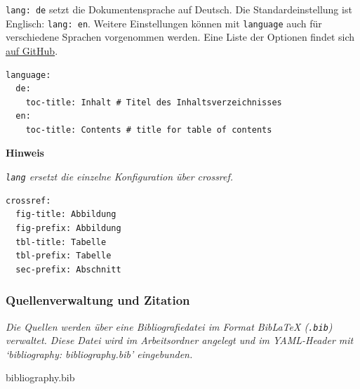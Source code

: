 \documentclass[
  letterpaper,
  DIV=11]{scrartcl}
\providecommand{\tightlist}{%
  \setlength{\itemsep}{0pt}\setlength{\parskip}{0pt}}\usepackage{longtable,booktabs,array}
\begin{document}
\texttt{lang:\ de} setzt die Dokumentensprache auf Deutsch. Die
Standardeinstellung ist Englisch: \texttt{lang:\ en}. Weitere
Einstellungen können mit \texttt{language} auch für verschiedene
Sprachen vorgenommen werden. Eine Liste der Optionen findet sich
\href{https://github.com/quarto-dev/quarto-cli/blob/main/src/resources/language/_language.yml}{auf
GitHub}.

\begin{verbatim}
language:
  de:
    toc-title: Inhalt # Titel des Inhaltsverzeichnisses
  en:
    toc-title: Contents # title for table of contents
\end{verbatim}

\begin{tcolorbox}[enhanced jigsaw, breakable, rightrule=.15mm, leftrule=.75mm, opacityback=0, colframe=quarto-callout-warning-color-frame, toprule=.15mm, left=2mm, colback=white, arc=.35mm, bottomrule=.15mm]
\begin{minipage}[t]{5.5mm}
\textcolor{quarto-callout-warning-color}{\faExclamationTriangle}
\end{minipage}%
\begin{minipage}[t]{\textwidth - 5.5mm}

\vspace{-3mm}\textbf{Hinweis}\vspace{3mm}

\emph{\texttt{lang} ersetzt die einzelne Konfiguration über crossref.}

\begin{verbatim}
crossref: 
  fig-title: Abbildung
  fig-prefix: Abbildung
  tbl-title: Tabelle
  tbl-prefix: Tabelle
  sec-prefix: Abschnitt
\end{verbatim}

\end{minipage}%
\end{tcolorbox}

\subsubsection{Quellenverwaltung und
Zitation}\label{quellenverwaltung-und-zitation}

\emph{Die Quellen werden über eine Bibliografiedatei im Format BibLaTeX
(\texttt{.bib}) verwaltet. Diese Datei wird im Arbeitsordner angelegt
und im YAML-Header mit `bibliography: bibliography.bib' eingebunden.}

\begin{description}
\tightlist
\item[Bibliografiedatei]
bibliography.bib
\end{description}
\end{document}
